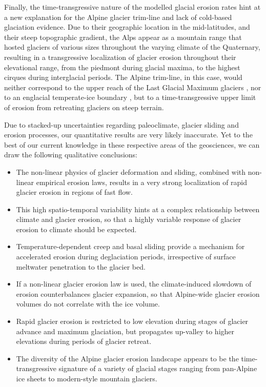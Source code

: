 \documentclass[esurf, manuscript]{copernicus}
\begin{document}
    Finally, the time-transgressive nature of the modelled glacial erosion
    rates hint at a new explanation for the Alpine glacier trim-line and lack
    of cold-based glaciation evidence. Due to their geographic location in the
    mid-latitudes, and their steep topographic gradient, the Alps appear as a
    mountain range that hosted glaciers of various sizes throughout the varying
    climate of the Quaternary, resulting in a transgressive localization of
    glacier erosion throughout their elevational range, from the piedmont
    during glacial maxima, to the highest cirques during interglacial periods.
    The Alpine trim-line, in this case, would neither correspond to the upper
    reach of the Last Glacial Maximum glaciers \citep[e.g.]{Kelly.etal.2004},
    nor to an englacial temperate-ice boundary \citep{Coutterand.2010,
    Seguinot.etal.2018}, but to a time-transgressive upper limit of erosion from
    retreating glaciers on steep terrain.


\conclusions

    Due to stacked-up uncertainties regarding paleoclimate, glacier sliding and
    erosion processes, our quantitative results are very likely inaccurate.
    Yet to the best of our current knowledge in these respective areas of
    the geosciences, we can draw the following qualitative conclusions:
    \begin{itemize}
      \item The non-linear physics of glacier deformation and sliding, combined
        with non-linear empirical erosion laws, results in a very strong
        localization of rapid glacier erosion in regions of fast flow.
      \item This high spatio-temporal variability hints at a complex
        relationship between climate and glacier erosion, so that a highly
        variable response of glacier erosion to climate should be expected.
      \item Temperature-dependent creep and basal sliding provide a mechanism
        for accelerated erosion during deglaciation periods, irrespective of
        surface meltwater penetration to the glacier bed.
      \item If a non-linear glacier erosion law is used, the climate-induced
        slowdown of erosion counterbalances glacier expansion, so that
        Alpine-wide glacier erosion volumes do not correlate with the ice volume.
      \item Rapid glacier erosion is restricted to low elevation during stages
        of glacier advance and maximum glaciation, but propagates up-valley to
        higher elevations during periods of glacier retreat.
      \item The diversity of the Alpine glacier erosion landscape appears to
        be the time-transgressive signature of a variety of glacial stages
        ranging from pan-Alpine ice sheets to modern-style mountain glaciers.
    \end{itemize}
\end{document}

